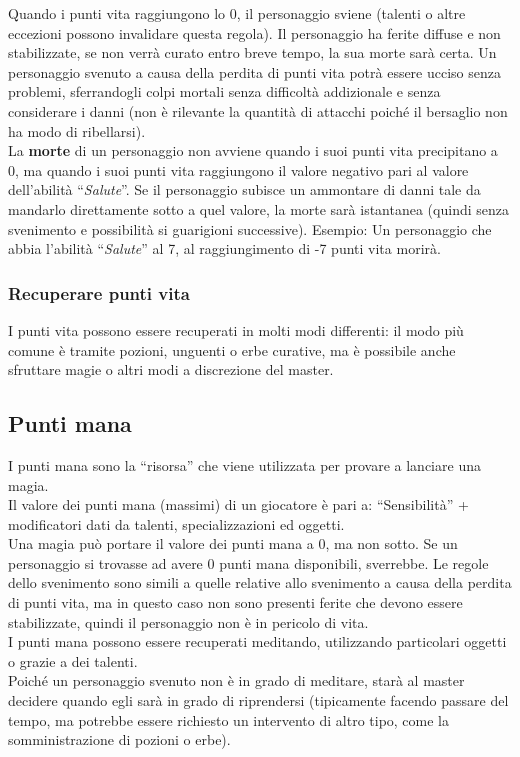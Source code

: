 \documentclass[../manuale_main.tex]{subfiles}
\begin{document}
Quando i punti vita raggiungono lo 0, il personaggio sviene (talenti o altre eccezioni possono invalidare questa regola). 
Il personaggio ha ferite diffuse e non stabilizzate, se non verrà curato entro breve tempo, la sua morte sarà certa.
Un personaggio svenuto a causa della perdita di punti vita potrà essere ucciso senza problemi, sferrandogli colpi mortali senza difficoltà addizionale e senza considerare i danni (non è rilevante la quantità di attacchi poiché il bersaglio non ha modo di ribellarsi).\\


La \textbf{morte} di un personaggio non avviene quando i suoi punti vita precipitano a 0, ma quando i suoi punti vita raggiungono il valore negativo pari al valore dell’abilità ``\emph{Salute}''. Se il personaggio subisce un ammontare di danni tale da mandarlo direttamente sotto a quel valore, la morte sarà istantanea (quindi senza svenimento e possibilità si guarigioni successive).
Esempio: Un personaggio che abbia l’abilità ``\emph{Salute}'' al 7, al raggiungimento di -7 punti vita morirà.

\subsubsection{Recuperare punti vita}
I punti vita possono essere recuperati in molti modi differenti: il modo più comune è tramite pozioni, unguenti o erbe curative, ma è possibile anche sfruttare magie o altri modi a discrezione del master.


\subsection{Punti mana}

I punti mana sono la “risorsa” che viene utilizzata per provare a lanciare una magia.\\
Il valore dei punti mana (massimi) di un giocatore è pari a: “Sensibilità” + modificatori dati da talenti, specializzazioni ed oggetti.\\

Una magia può portare il valore dei punti mana a 0, ma non sotto. Se un personaggio si trovasse ad avere 0 punti mana disponibili, sverrebbe. Le regole dello svenimento sono simili a quelle relative allo svenimento a causa della perdita di punti vita, ma in questo caso non sono presenti ferite che devono essere stabilizzate, quindi il personaggio non è in pericolo di vita.\\
I punti mana possono essere recuperati meditando, utilizzando particolari oggetti o grazie a dei talenti.\\
Poiché un personaggio svenuto non è in grado di meditare, starà al master decidere quando egli sarà in grado di riprendersi (tipicamente facendo passare del tempo, ma potrebbe essere richiesto un intervento di altro tipo, come la somministrazione di pozioni o erbe).
\end{document}
